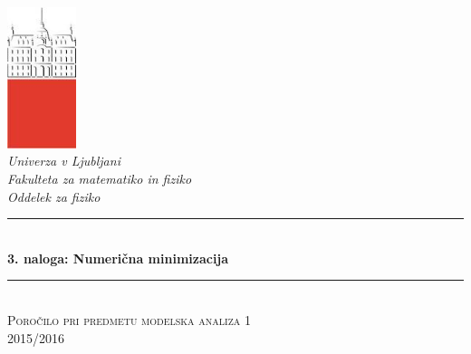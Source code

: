 \documentclass[slovene,11pt,a4paper]{article}
\numberwithin{equation}{section} %
\numberwithin{figure}{section} %
\numberwithin{table}{section} %
\begin{document}
\begin{titlepage}

\newcommand{\HRule}{\rule{\linewidth}{0.5mm}} %

\center %


 

\includegraphics[width=2cm]{slike/aaa}\\[0.5cm]
 
\textit{Univerza v Ljubljani}\\
\textit{Fakulteta za {\color{red}matematiko in fiziko}}\\[0.5cm]

\emph{Oddelek za fiziko}\\[0.5cm] %


\HRule \\[0.4cm]
\huge {\bfseries 3. naloga: Numerična minimizacija}\\[0.4cm] %
\HRule \\[0.5cm] 

 \textsc{\large Poročilo pri predmetu modelska analiza 1}\\
 \textsc{\large 2015/2016}\\[1cm] %
 

\end{titlepage}
\end{document}
